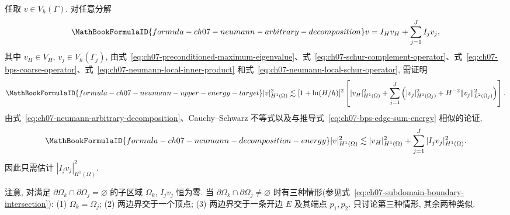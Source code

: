 \begin{Proof}
任取 $v\in V_h(\Gamma)$. 对任意分解
\begin{equation}
\MathBookFormulaID{formula-ch07-neumann-arbitrary-decomposition}
\label{eq:ch07-neumann-arbitrary-decomposition}
v=I_Hv_H+\sum_{j=1}^{J}I_jv_j,
\end{equation}
其中 $v_H\in V_H$, $v_j\in V_h(\Gamma_j)$, 由式~\eqref{eq:ch07-preconditioned-maximum-eigenvalue}、式~\eqref{eq:ch07-schur-complement-operator}、式~\eqref{eq:ch07-bps-coarse-operator}、式~\eqref{eq:ch07-neumann-local-inner-product} 和式~\eqref{eq:ch07-neumann-local-schur-operator}, 需证明
\begin{equation}
\MathBookFormulaID{formula-ch07-neumann-upper-energy-target}
\label{eq:ch07-neumann-upper-energy-target}
|v|_{H^1(\Omega)}^2
\lesssim[1+\ln(H/h)]^2
\left[|v_H|_{H^1(\Omega)}^2
+\sum_{j=1}^{J}\left(|v_j|_{H^1(\Omega_j)}^2
+H^{-2}\|v_j\|_{L^2(\Omega_j)}^2\right)\right].
\end{equation}
由式~\eqref{eq:ch07-neumann-arbitrary-decomposition}、Cauchy--Schwarz 不等式以及与推导式~\eqref{eq:ch07-bps-edge-sum-energy} 相似的论证,
\begin{equation}
\MathBookFormulaID{formula-ch07-neumann-decomposition-energy}
\label{eq:ch07-neumann-decomposition-energy}
|v|_{H^1(\Omega)}^2
\lesssim|v_H|_{H^1(\Omega)}^2
+\sum_{j=1}^{J}|I_jv_j|_{H^1(\Omega)}^2.
\end{equation}
因此只需估计 $|I_jv_j|_{H^1(\Omega)}^2$.

注意, 对满足 $\partial\Omega_k\cap\partial\Omega_j=\varnothing$ 的子区域 $\Omega_k$, $I_jv_j$ 恒为零. 当 $\partial\Omega_k\cap\partial\Omega_j\neq\varnothing$ 时有三种情形(参见式~\eqref{eq:ch07-subdomain-boundary-intersection}): (1) $\Omega_k=\Omega_j$; (2) 两边界交于一个顶点; (3) 两边界交于一条开边 $E$ 及其端点 $p_1,p_2$. 只讨论第三种情形, 其余两种类似.


\end{Proof}
